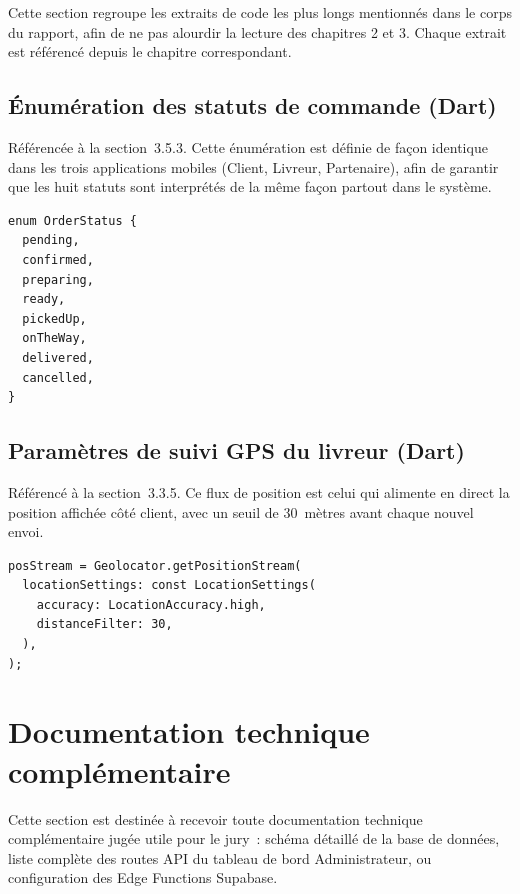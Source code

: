 \documentclass[12pt,fleqn,a4paper]{report}
\begin{document}
\begin{justify}
Cette section regroupe les extraits de code les plus longs mentionnés dans le corps du rapport, afin de ne pas alourdir la lecture des chapitres 2 et 3. Chaque extrait est référencé depuis le chapitre correspondant.

\subsection*{Énumération des statuts de commande (Dart)}

Référencée à la section~3.5.3. Cette énumération est définie de façon identique dans les trois applications mobiles (Client, Livreur, Partenaire), afin de garantir que les huit statuts sont interprétés de la même façon partout dans le système.

\begin{verbatim}
enum OrderStatus {
  pending,
  confirmed,
  preparing,
  ready,
  pickedUp,
  onTheWay,
  delivered,
  cancelled,
}
\end{verbatim}

\subsection*{Paramètres de suivi GPS du livreur (Dart)}

Référencé à la section~3.3.5. Ce flux de position est celui qui alimente en direct la position affichée côté client, avec un seuil de 30~mètres avant chaque nouvel envoi.

\begin{verbatim}
posStream = Geolocator.getPositionStream(
  locationSettings: const LocationSettings(
    accuracy: LocationAccuracy.high,
    distanceFilter: 30,
  ),
);
\end{verbatim}

\section*{Documentation technique complémentaire}

Cette section est destinée à recevoir toute documentation technique complémentaire jugée utile pour le jury~: schéma détaillé de la base de données, liste complète des routes API du tableau de bord Administrateur, ou configuration des Edge Functions Supabase.


\end{justify}
\end{document}
